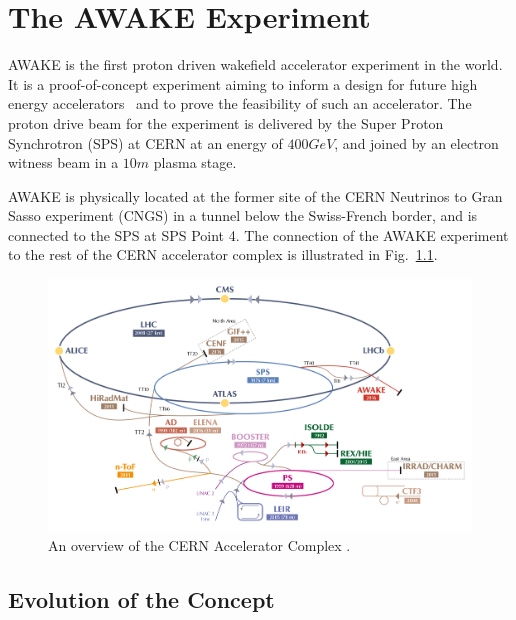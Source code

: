 %
%

\chapter{The AWAKE Experiment}
\label{Ch:WFA}

AWAKE is the first proton driven wakefield accelerator experiment in the world.
It is a proof-of-concept experiment aiming to inform a design for future high energy accelerators~\cite{gschwendtner:2016} and to prove the feasibility of such an accelerator.
The proton drive beam for the experiment is delivered by the Super Proton Synchrotron (SPS) at CERN at an energy of $400\unit{GeV}$, and joined by an electron witness beam in a $10\unit{m}$ plasma stage.

AWAKE is physically located at the former site of the CERN Neutrinos to Gran Sasso experiment (CNGS) \cite{gschwendtner:2010} in a tunnel below the Swiss-French border, and is connected to the SPS at SPS Point 4.
The connection of the AWAKE experiment to the rest of the CERN accelerator complex is illustrated in Fig.~\ref{Fig:WFA:AccComp}.

\begin{figure}[hbt]
    \centering
    \includegraphics[width=0.99\linewidth,trim={20mm 0mm 20mm 0mm},clip]{figures/AcceleratorComplex}
    \caption{\label{Fig:WFA:AccComp}
        An overview of the CERN Accelerator Complex \cite{add:mobs:2016}.
    }
\end{figure}

\section{Evolution of the Concept}
\label{WFA:History}

